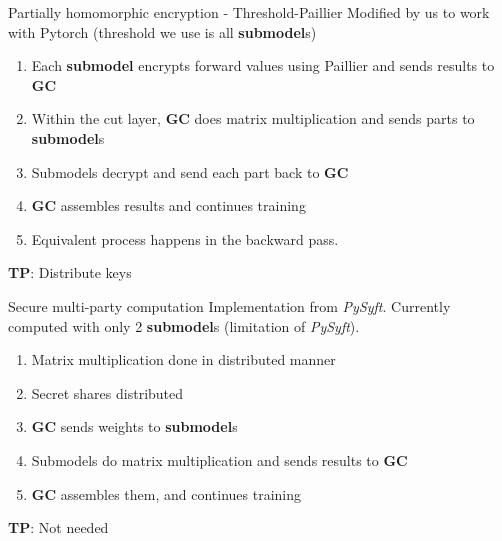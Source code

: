 \documentclass[xcolor=dvipsnames]{beamer}
\begin{document}

\begin{frame}{Partially homomorphic encryption - Threshold-Paillier}
Modified by us to work with Pytorch (threshold we use is all \textbf{submodel}s)
\begin{enumerate}
    \item Each \textbf{submodel} encrypts forward values using Paillier and sends results to \textbf{GC}
    \item Within the cut layer, \textbf{GC} does matrix multiplication and sends parts to \textbf{submodel}s
    \item Submodels decrypt and send each part back to \textbf{GC}
    \item \textbf{GC} assembles results and continues training
    \item Equivalent process happens in the backward pass.
\end{enumerate}
\textbf{TP}: Distribute keys
\end{frame}

\begin{frame}{Secure multi-party computation}
Implementation from \textit{PySyft}. Currently computed with only 2 \textbf{submodel}s (limitation of \textit{PySyft}).
\begin{enumerate}
    \item Matrix multiplication done in distributed manner
    \item Secret shares distributed 
    \item \textbf{GC} sends weights to \textbf{submodel}s
    \item Submodels do matrix multiplication and sends results to \textbf{GC}
    \item \textbf{GC} assembles them, and continues training
\end{enumerate}
\textbf{TP}: Not needed
\end{frame}
\end{document}

